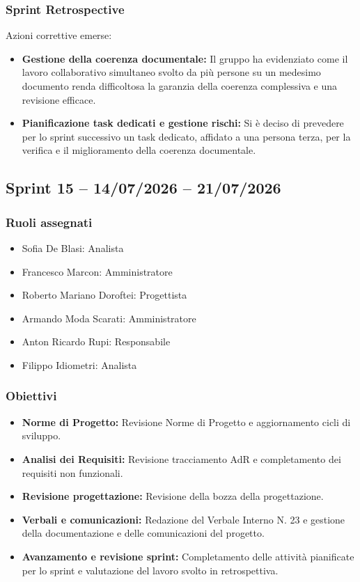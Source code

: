 \subsubsection{Sprint Retrospective}
Azioni correttive emerse:
\begin{itemize}
    \item \textbf{Gestione della coerenza documentale:} Il gruppo ha evidenziato come il lavoro collaborativo simultaneo svolto da più persone su un medesimo documento renda difficoltosa la garanzia della coerenza complessiva e una revisione efficace.
    \item \textbf{Pianificazione task dedicati e gestione rischi:} Si è deciso di prevedere per lo sprint successivo un task dedicato, affidato a una persona terza, per la verifica e il miglioramento della coerenza documentale.
\end{itemize}

\subsection{Sprint 15 -- 14/07/2026 -- 21/07/2026}
\label{sec:sprint15}

\subsubsection{Ruoli assegnati}
\begin{itemize}
    \item Sofia De Blasi: Analista
    \item Francesco Marcon: Amministratore
    \item Roberto Mariano Doroftei: Progettista
    \item Armando Moda Scarati: Amministratore
    \item Anton Ricardo Rupi: Responsabile
    \item Filippo Idiometri: Analista
\end{itemize}

\subsubsection{Obiettivi}
\begin{itemize}
    \item \textbf{Norme di Progetto:} Revisione Norme di Progetto e aggiornamento cicli di sviluppo.
    \item \textbf{Analisi dei Requisiti:} Revisione tracciamento AdR e completamento dei requisiti non funzionali.
    \item \textbf{Revisione progettazione:} Revisione della bozza della progettazione.
    \item \textbf{Verbali e comunicazioni:} Redazione del Verbale Interno N. 23 e gestione della documentazione e delle comunicazioni del progetto.
    \item \textbf{Avanzamento e revisione sprint:} Completamento delle attività pianificate per lo sprint e valutazione del lavoro svolto in retrospettiva.
\end{itemize}

